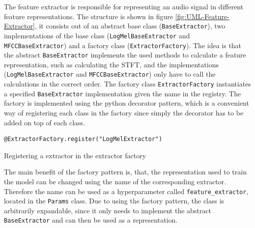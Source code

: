 \noindent
The feature extractor is responsible for representing an audio signal in different feature representations. The structure is shown in figure \ref{fig:UML-Feature-Extractor}, it consists out of an abstract base class (\texttt{BaseExtractor}), two implementations of the base class (\texttt{LogMelBaseExtractor} and \texttt{MFCCBaseExtractor}) and a factory class (\texttt{ExtractorFactory}). The idea is that the abstract \texttt{BaseExtractor} implements the used methods to calculate a feature representation, such as calculating the \gls{STFT}, and the implementations (\texttt{LogMelBaseExtractor} and \texttt{MFCCBaseExtractor}) only have to call the calculations in the correct order. The factory class \texttt{ExtractorFactory} instantiates a specified \texttt{BaseExtractor} implementation given the name in the registry. The factory is implemented using the python decorator pattern, which is a convenient way of registering each class in the factory since simply the decorator has to be added on top of each class.

\begin{code}[htbp]
\begin{verbatim}
@ExtractorFactory.register("LogMelExtractor")
\end{verbatim}
\caption{Registering a extractor in the extractor factory}
\label{code:Extractor-Factory}
\end{code}
\noindent
The main benefit of the factory pattern is, that, the representation used to train the model can be changed using the name of the corresponding extractor. Therefore the name can be used as a hyperparameter called \texttt{feature\_extractor}, located in the \texttt{Params} class. Due to using the factory pattern, the class is arbitrarily expandable, since it only needs to implement the abstract \texttt{BaseExtractor} and can then be used as a representation.

